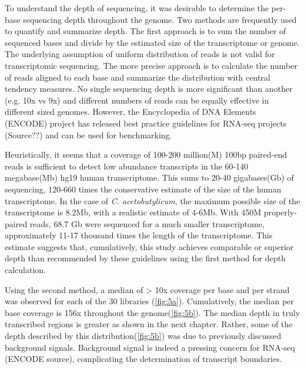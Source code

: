 To understand the depth of sequencing, it was desirable to determine the per-base sequencing depth throughout the genome. Two methods are frequently used to quantify and summarize depth. The first approach is to sum the number of sequenced bases and divide by the estimated size of the transcriptome or genome. The underlying assumption of uniform distribution of reads is not valid for transcriptomic sequencing. The more precise approach is to calculate the number of reads aligned to each base and summarize the distribution with central tendency measures. No single sequencing depth is more significant than another (e.g. 10x vs 9x) and different numbers of reads can be equally effective in different sized genomes. However, the Encyclopedia of DNA Elements (ENCODE) project has released best practice guidelines for RNA-seq projects (Source??) and can be used for benchmarking. 

Heuristically, it seems that a coverage of 100-200 million(M) 100bp paired-end reads is sufficient to detect low abundance transcripts in the 60-140 megabase(Mb) hg19 human transcriptome. This sums to 20-40 gigabases(Gb) of sequencing, 120-660 times the conservative estimate of the size of the human transcriptome. In the case of \textit{C. acetobutylicum}, the maximum possible size of the transcriptome is 8.2Mb, with a realistic estimate of 4-6Mb. With 450M properly-paired reads, 68.7 Gb were sequenced for a much smaller transcriptome, approximately 11-17 thousand times the length of the transcriptome. This estimate suggests that, cumulatively, this study achieves comparable or superior depth than recommended by these guidelines using the first method for depth calculation. 

Using the second method, a median of > 10x coverage per base and per strand was observed for each of the 30 libraries (\ref{fig:5a}). Cumulatively, the median per base coverage is 156x throughout the genome(\ref{fig:5b}). The median depth in truly transcribed regions is greater as shown in the next chapter. Rather, some of the depth described by this distribution(\ref{fig:5b}) was due to previously discussed background signals. Background signal is indeed a pressing concern for RNA-seq (ENCODE source), complicating the determination of transcript boundaries.


